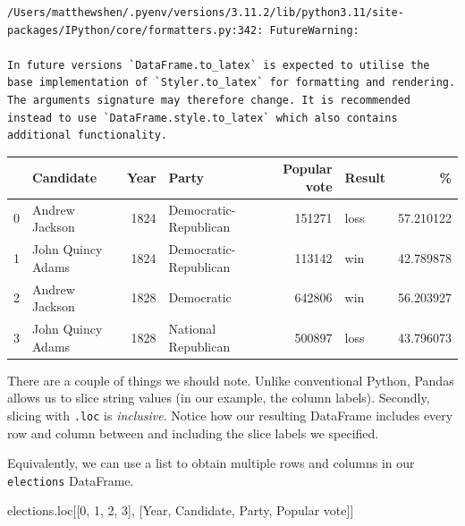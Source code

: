 \documentclass[
  letterpaper,
  DIV=11,
  numbers=noendperiod]{scrreprt}
\newenvironment{Shaded}{\begin{snugshade}}{\end{snugshade}}
\newcommand{\DecValTok}[1]{\textcolor[rgb]{0.68,0.00,0.00}{#1}}
\newcommand{\NormalTok}[1]{\textcolor[rgb]{0.00,0.23,0.31}{#1}}
\newcommand{\StringTok}[1]{\textcolor[rgb]{0.13,0.47,0.30}{#1}}
\begin{document}
\begin{verbatim}
/Users/matthewshen/.pyenv/versions/3.11.2/lib/python3.11/site-packages/IPython/core/formatters.py:342: FutureWarning:

In future versions `DataFrame.to_latex` is expected to utilise the base implementation of `Styler.to_latex` for formatting and rendering. The arguments signature may therefore change. It is recommended instead to use `DataFrame.style.to_latex` which also contains additional functionality.
\end{verbatim}

\begin{tabular}{llrlrlr}
\toprule
{} &          Candidate &  Year &                  Party &  Popular vote & Result &          \% \\
\midrule
0 &     Andrew Jackson &  1824 &  Democratic-Republican &        151271 &   loss &  57.210122 \\
1 &  John Quincy Adams &  1824 &  Democratic-Republican &        113142 &    win &  42.789878 \\
2 &     Andrew Jackson &  1828 &             Democratic &        642806 &    win &  56.203927 \\
3 &  John Quincy Adams &  1828 &    National Republican &        500897 &   loss &  43.796073 \\
\bottomrule
\end{tabular}

There are a couple of things we should note. Unlike conventional Python,
Pandas allows us to slice string values (in our example, the column
labels). Secondly, slicing with \texttt{.loc} is \emph{inclusive}.
Notice how our resulting DataFrame includes every row and column between
and including the slice labels we specified.

Equivalently, we can use a list to obtain multiple rows and columns in
our \texttt{elections} DataFrame.

\begin{Shaded}
\begin{Highlighting}[]
\NormalTok{elections.loc[[}\DecValTok{0}\NormalTok{, }\DecValTok{1}\NormalTok{, }\DecValTok{2}\NormalTok{, }\DecValTok{3}\NormalTok{], [}\StringTok{\textquotesingle{}Year\textquotesingle{}}\NormalTok{, }\StringTok{\textquotesingle{}Candidate\textquotesingle{}}\NormalTok{, }\StringTok{\textquotesingle{}Party\textquotesingle{}}\NormalTok{, }\StringTok{\textquotesingle{}Popular vote\textquotesingle{}}\NormalTok{]]}
\end{Highlighting}
\end{Shaded}
\end{document}
